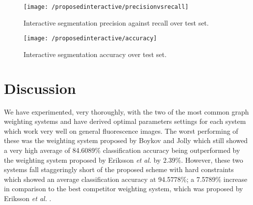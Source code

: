 \begin{figure}[!h]
	\centering
	\texttt{[image: /proposedinteractive/precisionvsrecall]}
	\caption{Interactive segmentation precision against recall over test set.}
	\label{fig:interactiveprecisionvsrecall}
\end{figure}

\begin{figure}[!t]
	\centering
	\texttt{[image: /proposedinteractive/accuracy]}
	\caption{Interactive segmentation accuracy over test set.}
	\label{fig:interactiveaccuracy}
\end{figure}

\newpage
\section{Discussion}
\label{sec:interactivediscussion}


We have experimented, very thoroughly, with the two of the most common graph weighting systems and have derived optimal parameters settings for each system which work very well on general fluorescence images. The worst performing of these was the weighting system proposed by Boykov and Jolly \citep{Boykov2001_2} which still showed a very high average of 84.6089\% classification accuracy being outperformed by the weighting system proposed by Eriksson \textit{et al.} \citep{Eriksson2006} by 2.39\%. However, these two systems fall staggeringly short of the proposed scheme with hard constraints which showed an average classification accuracy at 94.5778\%; a 7.5789\% increase in comparison to the best competitor weighting system, which was proposed by Eriksson \textit{et al.} \citep{Eriksson2006}.

